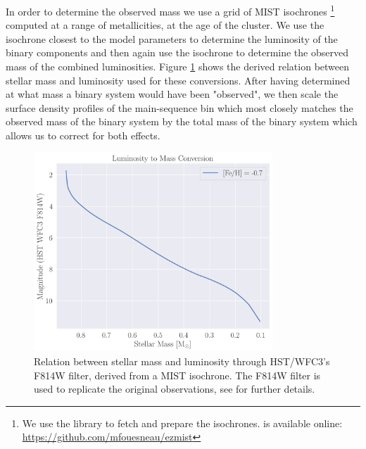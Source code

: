 In order to determine the observed mass we use a grid of MIST isochrones
\citep{Dotter2016,Choi2016}\footnote{We use the  library to fetch and prepare the
isochrones.  is available online: \url{https://github.com/mfouesneau/ezmist}} computed
at a range of metallicities, at the age of the cluster. We use the isochrone closest to the model
parameters to determine the luminosity of the binary components and then again use the isochrone to
determine the observed mass of the combined luminosities. Figure \ref{fig:2/isochrone} shows the
derived relation between stellar mass and luminosity used for these conversions. After having
determined at what mass a binary system would have been "observed", we then scale the surface
density profiles of the main-sequence bin which most closely matches the observed mass of the binary
system by the total mass of the binary system which allows us to correct for both effects.


\begin{figure}
    \centering
    \includegraphics[width=0.8\textwidth]{figures/isochrone_conversion.png}
    \caption{Relation between stellar mass and luminosity through HST/WFC3's F814W filter, derived
        from a MIST isochrone. The F814W filter is used to replicate the original observations, see
        \citet{Sollima2017} for further details.}
    \label{fig:2/isochrone}
\end{figure}